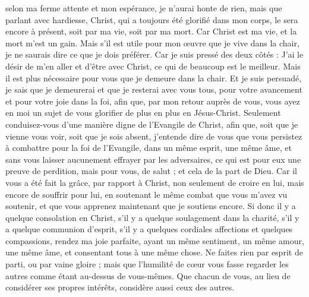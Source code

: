 \begin{multicols}{2}
selon ma ferme attente et mon espérance, je n’aurai honte de rien, mais que parlant avec hardiesse, Christ, qui a toujours été glorifié dans mon corps, le sera encore à présent, soit par ma vie, soit par ma mort.
Car Christ est ma vie, et la mort m’est un gain.
Mais s'il est utile pour mon œuvre que je vive dans la chair, je ne saurais dire ce que je dois préférer.
Car je suis pressé des deux côtés : J’ai le désir de m’en aller et d’être avec Christ, ce qui de beaucoup est le meilleur.
Mais il est plus nécessaire pour vous que je demeure dans la chair.
Et je suis persuadé, je sais que je demeurerai et que je resterai avec vous tous, pour votre avancement et pour votre joie dans la foi,
afin que, par mon retour auprès de vous, vous ayez en moi un sujet de vous glorifier de plus en plus en Jésus-Christ.
Seulement conduisez-vous d’une manière digne de l'Evangile de Christ, afin que, soit que je vienne vous voir, soit que je sois absent, j'entende dire de vous que vous persistez à combattre pour la foi de l’Evangile, dans un même esprit, une même âme, et sans vous laisser aucunement effrayer par les adversaires,
ce qui est pour eux une preuve de perdition, mais pour vous, de salut ; et cela de la part de Dieu.
Car il vous a été fait la grâce, par rapport à Christ, non seulement de croire en lui, mais encore de souffrir pour lui,
en soutenant le même combat que vous m’avez vu soutenir, et que vous apprenez maintenant que je soutiens encore.
\VerseOne{}Si donc il y a quelque consolation en Christ, s’il y a quelque soulagement dans la charité, s'il y a quelque communion d'esprit, s'il y a quelques cordiales affections et quelques compassions,
rendez ma joie parfaite, ayant un même sentiment, un même amour, une même âme, et consentant tous à une même chose.
Ne faites rien par esprit de parti, ou par vaine gloire ; mais que l’humilité de cœur vous fasse regarder les autres comme étant au-dessus de vous-mêmes.
Que chacun de vous, au lieu de considérer ses propres intérêts, considère aussi ceux des autres.

\end{multicols}
